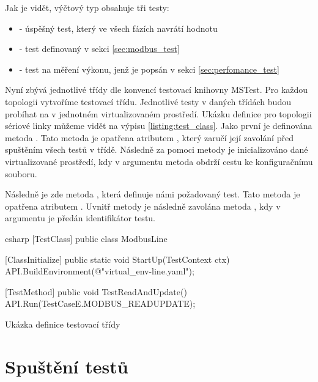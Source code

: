 Jak je vidět, výčtový typ obsahuje tři testy:

\begin{itemize}
    \item {} - úspěšný test, který ve všech fázích navrátí hodnotu 
    \item {} - test definovaný v sekci \ref{sec:modbus_test}
    \item {} - test na měření výkonu, jenž je popsán v sekci \ref{sec:perfomance_test}
\end{itemize}

Nyní zbývá jednotlivé třídy dle konvencí testovací knihovny MSTest. Pro každou topologii vytvoříme testovací třídu. Jednotlivé testy v daných třídách budou probíhat na v jednotném virtualizovaném prostředí. Ukázku definice pro topologii sériové linky můžeme vidět na výpisu \ref{listing:test_class}. Jako první je definována metoda . Tato metoda je opatřena atributem , který zaručí její zavolání před spuštěním všech testů v třídě. Následně za pomoci metody  je inicializováno dané virtualizované prostředí, kdy v argumentu metoda obdrží cestu ke konfiguračnímu souboru.

Následně je zde metoda , která definuje námi požadovaný test. Tato metoda je opatřena atributem . Uvnitř metody je následně zavolána metoda , kdy v argumentu je předán identifikátor testu. 

\begin{listing}[htbp]
    \centering
    \begin{cminted}[breaklines,autogobble, fontsize=\footnotesize]{csharp}
[TestClass]
public class ModbusLine
{
    [ClassInitialize]
    public static void StartUp(TestContext ctx)
    {
        API.BuildEnvironment(@"virtual_env\modbus\topologies\modbus-line.yaml");
    }

    [TestMethod]
    public void TestReadAndUpdate()
    {
        API.Run(TestCaseE.MODBUS_READUPDATE);
    }
}
    \end{cminted}
\caption{Ukázka definice testovací třídy}
\label{listing:test_class}
\end{listing}


\section{Spuštění testů}

